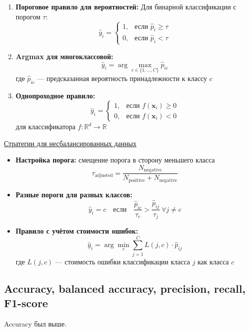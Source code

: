 \begin{enumerate}
    \item \textbf{Пороговое правило для вероятностей:}
    Для бинарной классификации с порогом $\tau$:
    \[ \hat{y}_i =
    \begin{cases}
        1, & \text{если } \hat{p}_i \geq \tau \\
        0, & \text{если } \hat{p}_i < \tau
    \end{cases} \]
    
    \item \textbf{Argmax для многоклассовой:}
    \[ \hat{y}_i = \arg\max_{c \in \{1,\dots,C\}} \hat{p}_{ic} \]
    где $\hat{p}_{ic}$ --- предсказанная вероятность принадлежности к классу $c$
    
    \item \textbf{Однопроходное правило:}
    \[ \hat{y}_i =
    \begin{cases}
        1, & \text{если } f(\bm{x}_i) \geq 0 \\
        0, & \text{если } f(\bm{x}_i) < 0
    \end{cases} \]
    для классификатора $f: \mathbb{R}^d \to \mathbb{R}$
\end{enumerate}

\underline{Стратегии для несбалансированных данных}

\begin{itemize}
    \item \textbf{Настройка порога:} смещение порога в сторону меньшего класса
    \[ \tau_{\text{adjusted}} = \frac{N_{\text{negative}}}{N_{\text{positive}} + N_{\text{negative}}} \]
    
    \item \textbf{Разные пороги для разных классов:}
    \[ \hat{y}_i = c \quad \text{если} \quad \frac{\hat{p}_{ic}}{\tau_c} > \frac{\hat{p}_{ij}}{\tau_j} \ \forall j \neq
    c \]
    
    \item \textbf{Правило с учётом стоимости ошибок:}
    \[ \hat{y}_i = \arg\min_{c} \sum_{j=1}^C L(j,c) \cdot \hat{p}_{ij} \]
    где $L(j,c)$ --- стоимость ошибки классификации класса $j$ как класса $c$
\end{itemize}

\subsection{Accuracy, balanced accuracy, precision, recall, F1-score}
Accuracy был выше.

